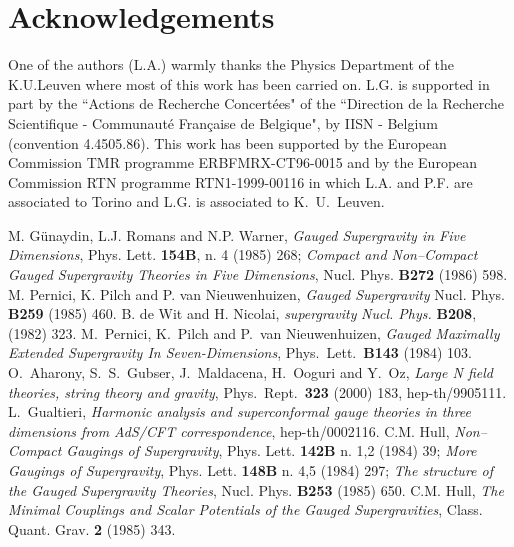 \documentclass[a4paper,12pt]{article}
\begin{document}
\section*{Acknowledgements}
One of the authors (L.A.) warmly thanks the Physics Department of
the K.U.Leuven where most of this work has been carried on. L.G.
is supported in part by the ``Actions de Recherche Concert{\'e}es"
of the ``Direction de la Recherche Scientifique - Communaut{\'e}
Fran{\c c}aise de Belgique", by IISN - Belgium (convention
4.4505.86). This work has been supported by the European
Commission TMR programme ERBFMRX-CT96-0015 and by the European
Commission RTN programme RTN1-1999-00116 in which L.A. and P.F.
are associated to Torino and L.G. is associated to K.\ U.\ Leuven.
\begin{thebibliography}{50}
M. G\"unaydin, L.J. Romans and N.P. Warner, {\it Gauged \coordHE{}
Supergravity in Five Dimensions}, Phys. Lett. {\bf 154B}, n. 4
(1985) 268; {\it Compact and Non--Compact Gauged Supergravity
Theories in Five Dimensions}, Nucl. Phys. {\bf B272} (1986) 598.
M. Pernici, K. Pilch and P. van Nieuwenhuizen, {\it Gauged
\coordHE{} Supergravity} Nucl. Phys. {\bf B259} (1985) 460.
 B. de Wit and H. Nicolai,
{\it {}\coordHE{} supergravity} {\it Nucl. Phys.} {\bf B208},
(1982) 323.
M.~Pernici, K.~Pilch and P.~van Nieuwenhuizen, {\it Gauged
Maximally Extended Supergravity In Seven-Dimensions}, Phys.\
Lett.\  {\bf B143} (1984) 103.
O.~Aharony, S.~S.~Gubser, J.~Maldacena, H.~Ooguri and Y.~Oz, {\it
Large N field theories, string theory and gravity}, Phys.\ Rept.\
{\bf 323} (2000) 183, hep-th/9905111.
\bibitem{Gualtieri:1999tu}
L.~Gualtieri, {\it Harmonic analysis and superconformal gauge
theories in three dimensions from AdS/CFT correspondence},
hep-th/0002116.
\bibitem{hull}
C.M. Hull, {\it Non--Compact Gaugings of \coordHE{} Supergravity},
Phys. Lett. {\bf 142B} n. 1,2 (1984) 39; {\it More Gaugings of
\coordHE{} Supergravity}, Phys. Lett. {\bf 148B} n. 4,5 (1984) 297;
{\it The structure of the Gauged \myHighlight{$N=8$}\coordHE{} Supergravity Theories},
Nucl. Phys. {\bf B253} (1985) 650.
\bibitem{hull2}
C.M. Hull, {\it The Minimal Couplings and Scalar Potentials of the
Gauged \coordHE{} Supergravities}, Class. Quant. Grav. {\bf 2} (1985)
343.

\end{thebibliography}
\end{document}

